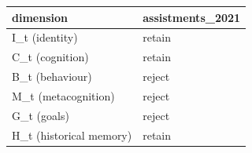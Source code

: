 \begin{tabular}{ll}
\toprule
dimension & assistments\_2021 \\
\midrule
I\_t (identity) & retain \\
C\_t (cognition) & retain \\
B\_t (behaviour) & reject \\
M\_t (metacognition) & reject \\
G\_t (goals) & reject \\
H\_t (historical memory) & retain \\
\bottomrule
\end{tabular}
